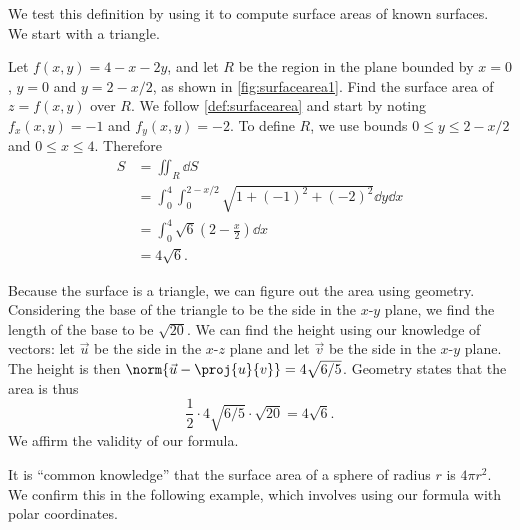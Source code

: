 
We test this definition by using it to compute surface areas of known surfaces. We start with a triangle.

\begin{example}\label{ex_surfacearea1}%
Let $f(x,y) = 4-x-2y$, and let $R$ be the region in the plane bounded by $x=0$, $y=0$ and $y=2-x/2$, as shown in \autoref{fig:surfacearea1}. Find the surface area of $z=f(x,y)$ over $R$.
%
%
\solution
We follow \autoref{def:surfacearea} and start by noting $f_x(x,y) = -1$ and $f_y(x,y) = -2$. To define $R$, we use bounds $0\leq y\leq 2-x/2$ and $0\leq x\leq 4$. Therefore
\begin{align*}
S &= \iint_R\dd S \\
  &= \int_0^4\int_0^{2-x/2} \sqrt{1+(-1)^2+(-2)^2}\dd y\dd x\\
	&= \int_0^4 \sqrt{6}\left(2-\frac x2\right)\dd x\\
	&= 4\sqrt{6}.
\end{align*}

Because the surface is a triangle, we can figure out the area using geometry. Considering the base of the triangle to be the side in the $x$-$y$ plane, we find the length of the base to be $\sqrt{20}$. We can find the height using our knowledge of vectors: let $\vec u$ be the side in the $x$-$z$ plane  and let $\vec v$ be the side in the $x$-$y$ plane. The height is then $\norm {\vec u - \proj{u}{v}} = 4\sqrt{6/5}$. Geometry states that the area is thus
\[\frac 12\cdot4\sqrt{6/5}\cdot\sqrt{20} = 4\sqrt{6}.\]
We affirm the validity of our formula.
\end{example}

It is ``common knowledge'' that the surface area of a sphere of radius $r$ is $4\pi r^2$. We confirm this in the following example, which involves using our formula with polar coordinates.

